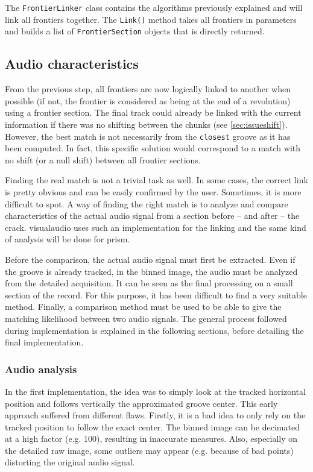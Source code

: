 The \texttt{FrontierLinker} class contains the algorithms previously explained and will link all frontiers together. The \texttt{Link()} method takes all frontiers in parameters and builds a list of \texttt{FrontierSection} objects that is directly returned.

\subsection{Audio characteristics}
\label{sec:audiochar}

From the previous step, all frontiers are now logically linked to another when possible (if not, the frontier is considered as being at the end of a revolution) using a frontier section. The final track could already be linked with the current information if there was no shifting between the chunks (see \autoref{sec:issueshift}). However, the best match is not necessarily from the \texttt{closest} groove as it has been computed. In fact, this specific solution would correspond to a match with no shift (or a null shift) between all frontier sections.

Finding the real match is not a trivial task as well. In some cases, the correct link is pretty obvious and can be easily confirmed by the user. Sometimes, it is more difficult to spot. A way of finding the right match is to analyze and compare characteristics of the actual audio signal from a section before -- and after -- the crack. \gls{visualaudio} uses such an implementation for the linking and the same kind of analysis will be done for \gls{prism}.

Before the comparison, the actual audio signal must first be extracted. Even if the groove is already tracked, in the binned image, the audio must be analyzed from the detailed acquisition. It can be seen as the final processing on a small section of the record. For this purpose, it has been difficult to find a very suitable method. Finally, a comparison method must be used to be able to give the matching likelihood between two audio signals.  The general process followed during implementation is explained in the following sections, before detailing the final implementation.

\subsubsection{Audio analysis}

In the first implementation, the idea was to simply look at the tracked horizontal position and follows vertically the approximated groove center. This early approach suffered from different flaws. Firstly, it is a bad idea to only rely on the tracked position to follow the exact center. The binned image can be decimated at a high factor (e.g. 100), resulting in inaccurate measures. Also, especially on the detailed raw image, some outliers may appear (e.g. because of bad points) distorting the original audio signal.

